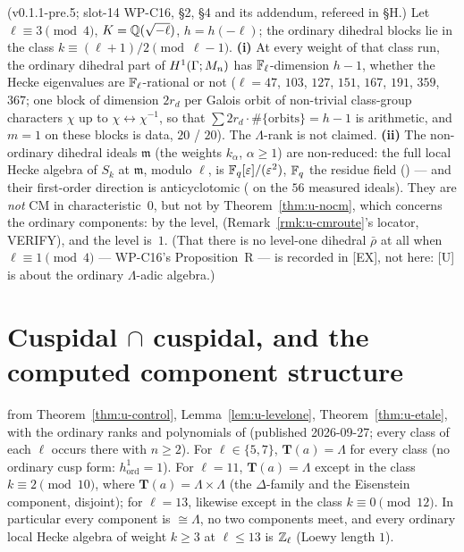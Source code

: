 \documentclass[11pt]{article}
\newcommand{\VERIFYloc}{\textsf{VERIFY}}          %
\newcommand{\Iw}{\Lambda}                         %
\newcommand{\Tu}{\mathbf{T}}                      %
\newcommand{\Zl}{\Z_\ell}
\begin{document}
\begin{remark}\label{rmk:u-dihedral}
(v0.1.1-pre.5; slot-14 WP-C16,  \S2, \S4 and its addendum, refereed in
 \S H.) Let $\ell\equiv3\pmod4$, $K=\mathbb{Q}(\sqrt{-\ell})$, $h=h(-\ell)$; the ordinary dihedral blocks lie in the class
$k\equiv(\ell+1)/2\pmod{\ell-1}$. \textbf{(i)} \COMP{} At every weight of that class run, the ordinary dihedral part of $H^{1}(\Gamma;M_n)$ has
$\mathbb{F}_\ell$-dimension $h-1$, whether the Hecke eigenvalues are $\mathbb{F}_\ell$-rational or not ($\ell=47$, $103$, $127$, $151$, $167$, $191$, $359$, $367$; one
block of dimension $2r_d$ per Galois orbit of non-trivial class-group characters $\chi$ up to $\chi\leftrightarrow\chi^{-1}$, so that
$\sum 2r_d\cdot\#\{\text{orbits}\}=h-1$ is arithmetic, and $m=1$ on these blocks is data, $20$ / $20$). The $\Iw$-rank is not claimed.
\textbf{(ii)} The non-ordinary dihedral ideals $\mathfrak m$ (the weights $k_\alpha$, $\alpha\ge1$) are non-reduced: the full local Hecke algebra of $S_k$ at
$\mathfrak m$, modulo $\ell$, is $\mathbb{F}_q[\varepsilon]/(\varepsilon^{2})$, $\mathbb{F}_q$ the residue field (\COMP{}) --- and their first-order direction is anticyclotomic (\COMP{} on the
$56$ measured ideals). They are \emph{not} CM in characteristic~$0$, but not by Theorem~\ref{thm:u-nocm}, which concerns the ordinary
components: by the level,  (Remark~\ref{rmk:u-cmroute}'s locator, \VERIFYloc), and the
level is~$1$. (That there is no level-one dihedral $\bar\rho$ at all when $\ell\equiv1\pmod4$ --- WP-C16's Proposition~R --- is recorded in
[EX], not here: [U] is about the ordinary $\Iw$-adic algebra.)
\end{remark}

\section{Cuspidal \texorpdfstring{$\cap$}{cap} cuspidal, and the computed component structure}\label{sec:u-cc}

\begin{theorem}\label{thm:u-ell13}
\PROVED{} from Theorem~\ref{thm:u-control}, Lemma~\ref{lem:u-levelone}, Theorem~\ref{thm:u-etale}, with the \COMP{} ordinary ranks and polynomials of
 (published 2026-09-27; every class of each $\ell$ occurs there with $n\ge2$). For
$\ell\in\{5,7\}$, $\Tu(a)=\Iw$ for every class (no ordinary cusp form: $h^{1}_{\mathrm{ord}}=1$). For $\ell=11$, $\Tu(a)=\Iw$ except in the class $k\equiv2
\pmod{10}$, where $\Tu(a)=\Iw\times\Iw$ (the $\Delta$-family and the Eisenstein component, disjoint); for $\ell=13$, likewise except in the class $k\equiv0
\pmod{12}$. In particular every component is $\cong\Iw$, no two components meet, and every ordinary local Hecke algebra of weight $k\ge3$ at $\ell\le13$ is
$\Zl$ (Loewy length $1$).
\end{theorem}
\end{document}

